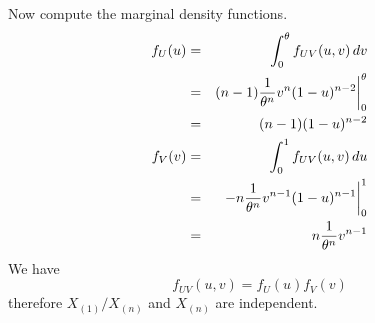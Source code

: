 Now compute the marginal density functions.
\begin{eqnarray*}
f_U(u)&=&\int_0^\theta f_{UV}(u,v)\,dv\\
&=&(n-1)
{1\over\theta^n}
v^n
(1-u)^{n-2}\bigg|_0^\theta\\
&=&(n-1)(1-u)^{n-2}\\
%
f_V(v)&=&\int_0^1f_{UV}(u,v)\,du\\
&=&-n{1\over\theta^n}v^{n-1}(1-u)^{n-1}\bigg|_0^1\\
&=&n{1\over\theta^n}v^{n-1}
\end{eqnarray*}
We have
$$f_{UV}(u,v)=f_U(u)f_V(v)$$
therefore $X_{(1)}/X_{(n)}$ and $X_{(n)}$ are independent.

